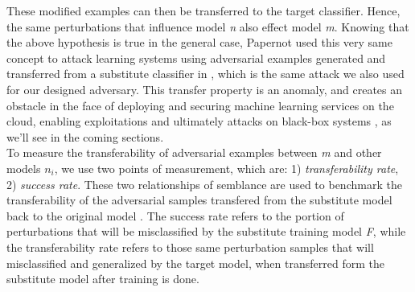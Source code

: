 \documentclass[grad,lot,lof,11pt,oneside,onehalfspace]{RUthesis}
\begin{document}
 \newline
 These modified examples can then be transferred to the target classifier. Hence, the same perturbations that influence model \textit{n} also effect model \textit{m}. Knowing that the above hypothesis is true in the general case, Papernot used this very same concept to attack learning systems using adversarial examples generated and transferred from a substitute classifier in \cite{papernot_practical_2017}, which is the same attack we also used for our designed adversary. This transfer property is an anomaly, and creates an obstacle in the face of deploying and securing machine learning services on the cloud, enabling exploitations and ultimately attacks on black-box systems \cite{tramer_space_2017}, as we'll see in the coming sections.\\
 To measure the transferability of adversarial examples between \textit{m} and other models \textit{$n_{i}$}, we use two points of measurement, which are: 1) \textit{transferability rate}, 2) \textit{success rate}. These two relationships of semblance are used to benchmark the transferability of the adversarial samples transfered from the substitute model back to the original model \cite{papernot_practical_2017}. The success rate refers to the portion of perturbations that will be misclassified by the substitute training model \textit{F}, while the transferability rate refers to those same perturbation samples that will misclassified and generalized  by the target model, when transferred form the substitute model after training is done. 
\end{document}
